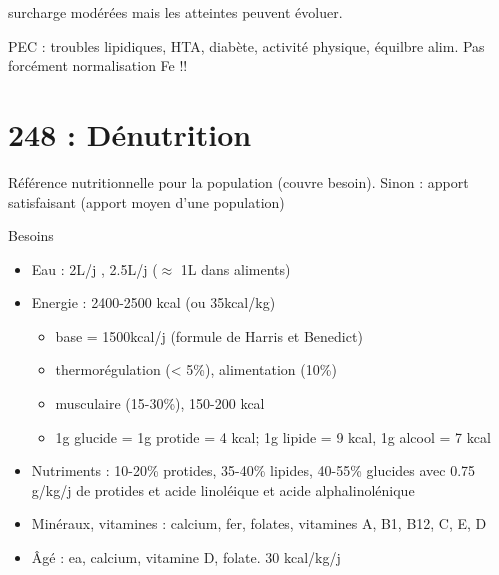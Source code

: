 \documentclass[11pt]{article}
\begin{document}
surcharge modérées mais les atteintes peuvent évoluer. 

PEC : troubles lipidiques, HTA, diabète, activité physique, équilbre alim. Pas
forcément normalisation Fe !!


\printglossaries
\section{248 : Dénutrition}
\label{sec:org5733b2c}
Référence nutritionnelle pour la population (couvre besoin). Sinon : apport
satisfaisant (apport moyen d'une population)

Besoins
\begin{itemize}
\item Eau : 2L/j \female{}, 2.5L/j \male{} (\(\approx\) 1L dans aliments)
\item Energie : 2400-2500 kcal (ou 35kcal/kg)
\begin{itemize}
\item base = 1500kcal/j \male{} (formule de Harris et Benedict)
\item thermorégulation (< 5\%), alimentation (10\%)
\item musculaire (15-30\%), 150-200 kcal
\item 1g glucide = 1g protide = 4 kcal; 1g lipide = 9 kcal, 1g alcool = 7 kcal
\end{itemize}
\item Nutriments : 10-20\% protides, 35-40\% lipides, 40-55\% glucides avec 0.75 g/kg/j
de protides et acide linoléique et acide alphalinolénique
\item Minéraux, vitamines : calcium, fer, folates, vitamines A, B1, B12, C, E, D
\item Âgé : \inc ea, calcium, vitamine D, folate. 30 kcal/kg/j
\end{itemize}
\end{document}
